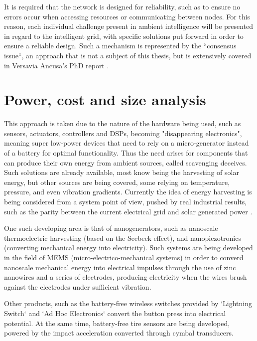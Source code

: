 \documentclass[12pt, english, a4paper]{report}
\begin{document}
It is required that the network is designed for reliability, such as to ensure no errors occur when accessing resources or communicating
between nodes. For this reason, each individual challenge present in ambient intelligence will be presented in regard to the intelligent 
grid, with specific solutions put forward in order to ensure a reliable design. Such a mechanism is represented by the ``consensus issue``,
an approach that is not a subject of this thesis, but is extensively covered in Versavia Ancusa's PhD report \cite{107}.

\section{Power, cost and size analysis}

This approach is taken due to the nature of the hardware being used, such as sensors, actuators, controllers and DSPs, becoming 
"disappearing electronics", meaning super low-power devices that need to rely on a micro-generator instead of a battery for optimal
functionality. Thus the need arises for components that can produce their own energy from ambient sources, called scavenging deceives.
Such solutions are already available, most know being the harvesting of solar energy, but other sources are being covered, some relying 
on temperature, pressure, and even vibration gradients. Currently the idea of energy harvesting is being considered from a system point
of view, pushed by real industrial results, such as the parity between the current electrical grid and solar generated power 
 \cite{36, 70, 71, 94}.

One such developing area is that of nanogenerators, such as nanoscale thermoelectric harvesting (based on the Seebeck effect), and
nanopiezotronics (converting mechanical energy into electricity). Such systems are being developed in the field of MEMS 
(micro-electrico-mechanical systems) in order to converd nanoscale mechanical energy into electrical impulses through the use of
zinc nanowires and a series of electrodes, producing electricity when the wires brush against the electrodes under sufficient vibration.
\cite{23, 71}

Other products, such as the battery-free wireless switches provided by `Lightning Switch` and `Ad Hoc Electronics` convert the button press
into electrical potential. At the same time, battery-free tire sensors are being developed, powered by the impact acceleration converted
through cymbal transducers. \cite{36}
\end{document}
